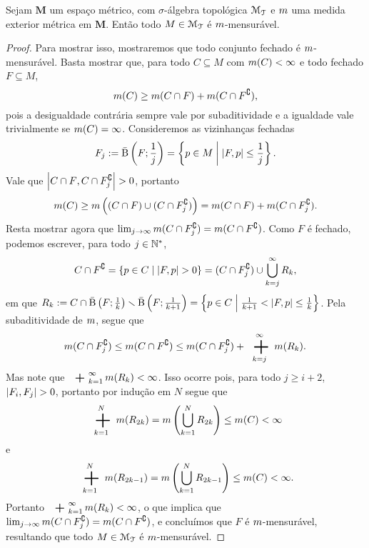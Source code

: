\begin{proposition}
\label{prop:criterio.mensur.med.metrica}
Sejam $\bm M$ um espaço métrico, com $\sigma$-álgebra topológica $\mathcal{M}_{\mathcal{T}}$ e $m$ uma medida exterior métrica em $\bm M$. Então todo $M \in \mathcal{M}_{\mathcal{T}}$ é $m$-mensurável.
\end{proposition}
\begin{proof}
Para mostrar isso, mostraremos que todo conjunto fechado é $m$-mensurável. Basta mostrar que, para todo $C \subseteq M$ com $m(C) < \infty$ e todo fechado $F \subseteq M$,
	\begin{equation*}
	m(C) \geq m(C \cap F) + m(C \cap F^\complement),
	\end{equation*}
pois a desigualdade contrária sempre vale por subaditividade e a igualdade vale trivialmente se $m(C) = \infty$. Consideremos as vizinhanças fechadas
	\begin{equation*}
	F_j := \bar{\mathrm{B}}\left(F; \frac{1}{j}\right) = \left\{ p \in M \;\middle\vert\; \left\vert{F},{p}\right\vert \leq \frac{1}{j} \right\}.
	\end{equation*}
Vale que $\left\vert{C \cap F},{C \cap F_j^\complement}\right\vert > 0$, portanto
	\begin{equation*}
	m(C) \geq m\left( (C \cap F) \cup (C \cap F_j^\complement) \right) = m(C \cap F) + m(C \cap F_j^\complement).
	\end{equation*}
Resta mostrar agora que $\lim_{j \rightarrow \infty} m(C \cap F_j^\complement) = m(C \cap F^\complement)$. Como $F$ é fechado, podemos escrever, para todo $j \in \mathbb{N}^*$,
	\begin{equation*}
	C \cap F^\complement = \left\{ p \in C \;\middle\vert\; \left\vert{F},{p}\right\vert > 0 \right\} = (C \cap F_j^\complement) \cup \bigcup_{k=j}^\infty R_k,
	\end{equation*}
em que $R_k := C \cap \bar{\mathrm{B}}\left(F; \frac{1}{k}\right) \smallsetminus \bar{\mathrm{B}}\left(F; \frac{1}{k+1}\right) = \left\{ p \in C \;\middle\vert\; \frac{1}{k+1} < \left\vert{F},{p}\right\vert \leq \frac{1}{k} \right\}$. Pela subaditividade de $m$, segue que
	\begin{equation*}
	\med(C \cap F_j^\complement) \leq \med(C \cap F^\complement) \leq \med(C \cap F_j^\complement) + \sum_{k=j}^\infty \med(R_k).
	\end{equation*}
Mas note que $\sum_{k=1}^\infty \med(R_k) < \infty$. Isso ocorre pois, para todo $j \geq i+2$, $\left\vert{F_i},{F_j}\right\vert > 0$, portanto por indução em $N$ segue que
	\begin{equation*}
	\sum_{k=1}^N \med(R_{2k}) = \med\left( \bigcup_{k=1}^N R_{2k} \right) \leq \med(C) < \infty
	\end{equation*}
e
	\begin{equation*}
	\sum_{k=1}^N \med(R_{2k-1}) = \med\left( \bigcup_{k=1}^N R_{2k-1} \right) \leq \med(C) < \infty.
	\end{equation*}
Portanto $\sum_{k=1}^\infty \med(R_k) < \infty$, o que implica que $\lim_{j \rightarrow \infty} m(C \cap F_j^\complement) = m(C \cap F^\complement)$, e concluímos que $F$ é $m$-mensurável, resultando que todo $M \in \mathcal{M}_{\mathcal{T}}$ é $m$-mensurável.
\end{proof}

